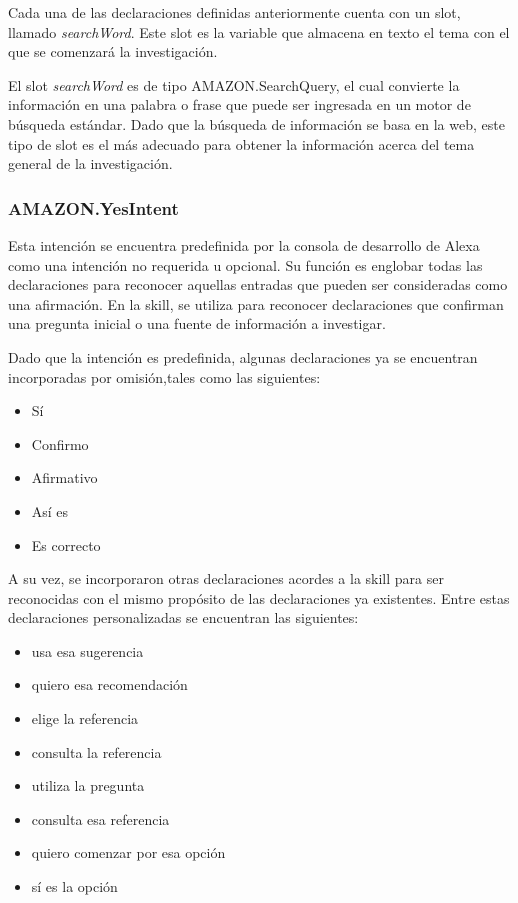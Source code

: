 Cada una de las declaraciones definidas anteriormente cuenta con un slot, llamado \textit{searchWord}. Este slot es la variable que almacena en texto el tema con el que se comenzará la investigación.

El slot \textit{searchWord} es de tipo AMAZON.SearchQuery, el cual convierte la información en una palabra o frase que puede ser ingresada en un motor de búsqueda estándar. Dado que la búsqueda de información se basa en la web, este tipo de slot es el más adecuado para obtener la información acerca del tema general de la investigación.


\subsubsection{AMAZON.YesIntent}
\label{YesIntentcapIV}

Esta intención se encuentra predefinida por la consola de desarrollo de Alexa como una intención no requerida u opcional. Su función es englobar todas las declaraciones para reconocer aquellas entradas que pueden ser consideradas como una afirmación. En la skill, se utiliza para reconocer declaraciones que confirman una pregunta inicial o una fuente de información a investigar.

Dado que la intención es predefinida, algunas declaraciones ya se encuentran incorporadas por omisión,tales como las siguientes:

\begin{itemize}
  \item Sí
  \item Confirmo
  \item Afirmativo
  \item Así es
  \item Es correcto
\end{itemize}

A su vez, se incorporaron otras declaraciones acordes a la skill para ser reconocidas con el mismo propósito de las declaraciones ya existentes. Entre estas declaraciones personalizadas se encuentran las siguientes:

\begin{itemize}
  \item usa esa sugerencia
  \item quiero esa recomendación
  \item elige la referencia
  \item consulta la referencia
  \item utiliza la pregunta
  \item consulta esa referencia
  \item quiero comenzar por esa opción
  \item sí es la opción
\end{itemize}


